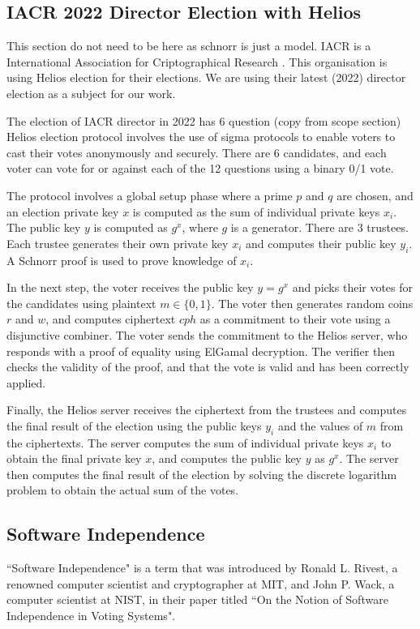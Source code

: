 \subsection{IACR 2022 Director Election with Helios} 
This section do not need to be here as schnorr is just a model.
IACR is a International Association for Criptographical Research \cite{iacr}. This organisation is using Helios election for their elections. We are using their latest (2022) director election as a subject for our work.

The election of IACR director in 2022 has 6 question (copy from scope section)
Helios election protocol involves the use of sigma protocols to enable voters to cast their votes anonymously and securely. There are 6 candidates, and each voter can vote for or against each of the 12 questions using a binary 0/1 vote. 

The protocol involves a global setup phase where a prime $p$ and $q$ are chosen, and an election private key $x$ is computed as the sum of individual private keys $x_i$. The public key $y$ is computed as $g^x$, where $g$ is a generator. There are 3 trustees. Each trustee generates their own private key $x_i$ and computes their public key $y_i$. A Schnorr proof is used to prove knowledge of $x_i$. 

In the next step, the voter receives the public key $y = g^x$ and picks their votes for the candidates using plaintext $m \in \{0,1\}$. The voter then generates random coins $r$ and $w$, and computes ciphertext $cph$ as a commitment to their vote using a disjunctive combiner. The voter sends the commitment to the Helios server, who responds with a proof of equality using ElGamal decryption. The verifier then checks the validity of the proof, and that the vote is valid and has been correctly applied.

Finally, the Helios server receives the ciphertext from the trustees and computes the final result of the election using the public keys $y_i$ and the values of $m$ from the ciphertexts. The server computes the sum of individual private keys $x_i$ to obtain the final private key $x$, and computes the public key $y$ as $g^x$. The server then computes the final result of the election by solving the discrete logarithm problem to obtain the actual sum of the votes. \\


\subsection{Software Independence} 
``Software Independence" is a term that was introduced by Ronald L. Rivest, \cite{Rivest2008OnTN} a renowned computer scientist and cryptographer at MIT, and John P. Wack, a computer scientist at NIST, in their paper titled ``On the Notion of Software Independence in Voting Systems". 


